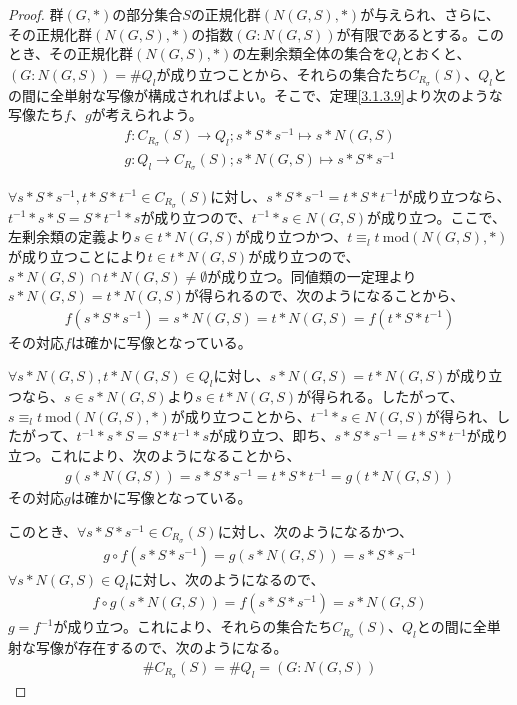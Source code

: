 \documentclass[dvipdfmx]{jsarticle}
\begin{document}
\begin{proof}
群$(G,*)$の部分集合$S$の正規化群$\left( N(G,S),* \right)$が与えられ、さらに、その正規化群$\left( N(G,S),* \right)$の指数$\left( G:N(G,S) \right)$が有限であるとする。このとき、その正規化群$\left( N(G,S),* \right)$の左剰余類全体の集合を$Q_{l}$とおくと、$\left( G:N(G,S) \right) = \#Q_{l}$が成り立つことから、それらの集合たち$C_{R_{\sigma}}(S)$、$Q_{l}$との間に全単射な写像が構成されればよい。そこで、定理\ref{3.1.3.9}より次のような写像たち$f$、$g$が考えられよう。
\begin{align*}
f:C_{R_{\sigma}}(S) \rightarrow Q_{l};s*S*s^{- 1} \mapsto s*N(G,S)
\end{align*}
\begin{align*}
g:Q_{l} \rightarrow C_{R_{\sigma}}(S);s*N(G,S) \mapsto s*S*s^{- 1}
\end{align*}\par
$\forall s*S*s^{- 1},t*S*t^{- 1} \in C_{R_{\sigma}}(S)$に対し、$s*S*s^{- 1} = t*S*t^{- 1}$が成り立つなら、$t^{- 1}*s*S = S*t^{- 1}*s$が成り立つので、$t^{- 1}*s \in N(G,S)$が成り立つ。ここで、左剰余類の定義より$s \in t*N(G,S)$が成り立つかつ、$t \equiv_{l}t\ \mathrm{mod}\left( N(G,S),* \right)$が成り立つことにより$t \in t*N(G,S)$が成り立つので、$s*N(G,S) \cap t*N(G,S) \neq \emptyset$が成り立つ。同値類の一定理より$s*N(G,S) = t*N(G,S)$が得られるので、次のようになることから、
\begin{align*}
f\left( s*S*s^{- 1} \right) = s*N(G,S) = t*N(G,S) = f\left( t*S*t^{- 1} \right)
\end{align*}
その対応$f$は確かに写像となっている。\par
$\forall s*N(G,S),t*N(G,S) \in Q_{l}$に対し、$s*N(G,S) = t*N(G,S)$が成り立つなら、$s \in s*N(G,S)$より$s \in t*N(G,S)$が得られる。したがって、$s \equiv_{l}t\ \mathrm{mod}\left( N(G,S),* \right)$が成り立つことから、$t^{- 1}*s \in N(G,S)$が得られ、したがって、$t^{- 1}*s*S = S*t^{- 1}*s$が成り立つ、即ち、$s*S*s^{- 1} = t*S*t^{- 1}$が成り立つ。これにより、次のようになることから、
\begin{align*}
g\left( s*N(G,S) \right) = s*S*s^{- 1} = t*S*t^{- 1} = g\left( t*N(G,S) \right)
\end{align*}
その対応$g$は確かに写像となっている。\par
このとき、$\forall s*S*s^{- 1} \in C_{R_{\sigma}}(S)$に対し、次のようになるかつ、
\begin{align*}
g \circ f\left( s*S*s^{- 1} \right) = g\left( s*N(G,S) \right) = s*S*s^{- 1}
\end{align*}
$\forall s*N(G,S) \in Q_{l}$に対し、次のようになるので、
\begin{align*}
f \circ g\left( s*N(G,S) \right) = f\left( s*S*s^{- 1} \right) = s*N(G,S)
\end{align*}
$g = f^{- 1}$が成り立つ。これにより、それらの集合たち$C_{R_{\sigma}}(S)$、$Q_{l}$との間に全単射な写像が存在するので、次のようになる。
\begin{align*}
\#{C_{R_{\sigma}}(S)} = \#Q_{l} = \left( G:N(G,S) \right)
\end{align*}

\end{proof}
\end{document}

